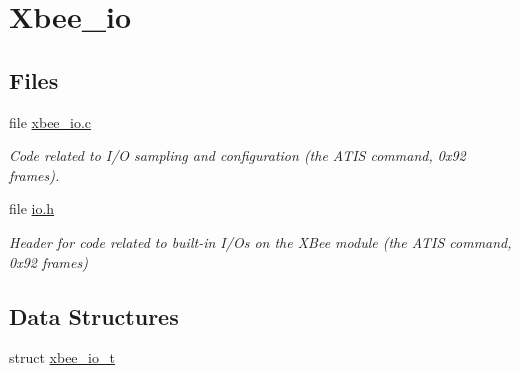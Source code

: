 \hypertarget{group__xbee__io}{\section{Xbee\-\_\-io}
\label{group__xbee__io}
}
\subsection*{Files}
\begin{DoxyCompactItemize}
\item 
file \hyperlink{xbee__io_8c}{xbee\-\_\-io.\-c}
\begin{DoxyCompactList}\small\item\em Code related to I/\-O sampling and configuration (the A\-T\-I\-S command, 0x92 frames). \end{DoxyCompactList}\item 
file \hyperlink{io_8h}{io.\-h}
\begin{DoxyCompactList}\small\item\em Header for code related to built-\/in I/\-Os on the X\-Bee module (the A\-T\-I\-S command, 0x92 frames) \end{DoxyCompactList}\end{DoxyCompactItemize}
\subsection*{Data Structures}
\begin{DoxyCompactItemize}
\item 
struct \hyperlink{structxbee__io__t}{xbee\-\_\-io\-\_\-t}
\end{DoxyCompactItemize}

